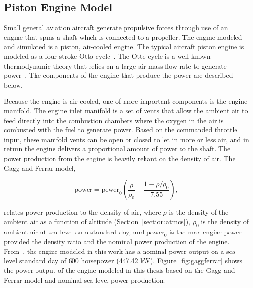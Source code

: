\subsection{\textbf{Piston Engine Model}}
Small general aviation aircraft generate propulsive forces through use of an engine that spins a shaft which is connected to a propeller. The engine modeled and simulated is a piston, air-cooled engine. The typical aircraft piston engine is modeled as a four-stroke Otto cycle~\cite{raymerAircraftDesignConceptual2018}. The Otto cycle is a well-known thermodynamic theory that relies on a large air mass flow rate to generate power~\cite{gudmundssonGeneralAviationAircraft2014}. The components of the engine that produce the power are described below.

Because the engine is air-cooled, one of more important components is the engine manifold. The engine inlet manifold is a set of vents that allow the ambient air to feed directly into the combustion chambers where the oxygen in the air is combusted with the fuel to generate power. Based on the commanded throttle input, these manifold vents can be open or closed to let in more or less air, and in return the engine delivers a proportional amount of power to the shaft. The power production from the engine is heavily reliant on the density of air. The Gagg and Ferrar model,

\begin{equation}\label{eq:gaggandferrar}
    \textrm{power} = \textrm{power}_{0}\left(\frac{\rho}{\rho_0} - \frac{1 - \rho/\rho_0}{7.55}\right),
\end{equation}

relates power production to the density of air, where \(\rho \) is the density of the ambient air as a function of altitude (Section~\ref{section:atmos}), \(\rho_0\) is the density of ambient air at sea-level on a standard day, and \(\textrm{power}_0\) is the max engine power provided the density ratio and the nominal power production of the engine. From~\cite{hartzellpropellerHartzellPropellerManual2023}, the engine modeled in this work has a nominal power output on a sea-level standard day of 600 horsepower (447.42 kW). Figure~\ref{fig:gaggferrar} shows the power output of the engine modeled in this thesis based on the Gagg and Ferrar model and nominal sea-level power production.

